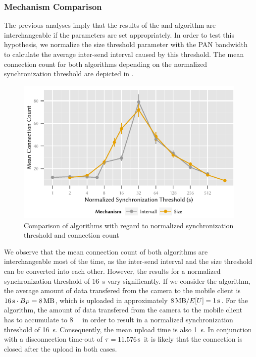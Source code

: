 \subsubsection*{Mechanism Comparison}\label{sec:application:cloud_file_synchronisation:numerical_evaluation:mechanism_comparison}
The previous analyses imply that the results of the \algointerval and \algosize algorithm are interchangeable if the parameters are set appropriately.
In order to test this hypothesis, we normalize the size threshold parameter with the \gls{PAN} bandwidth to calculate the average inter-send interval caused by this threshold.
The mean connection count for both algorithms depending on the normalized synchronization threshold are depicted in . 
\begin{figure}
  \includegraphics{application/cloud_file_synchronization/numerical_evaluation/figures/comparison}
  \caption{Comparison of algorithms with regard to normalized synchronization threshold and connection count}
  \label{fig:application:cloud_file_synchronisation:numerical_evaluation:mechanism_comparison:comparison}
\end{figure}

We observe that the mean connection count of both algorithms are interchangeable most of the time, as the inter-send interval and the size threshold can be converted into each other.
However, the results for a normalized synchronization threshold of \SI{16}{\second} vary significantly.
If we consider the \algointerval algorithm, the average amount of data transfered from the camera to the mobile client is \(\SI{16}{\second} \cdot \panTransferRate=\SI{8}{\mega\byte}\), which is uploaded in approximately \(\SI{8}{\mega\byte} / E[U] = \SI{1}{\second}\).
For the \algosize algorithm, the amount of data transfered from the camera to the mobile client has to accumulate to \SI{8}{\mega\byte} in order to result in a normalized synchronization threshold of \SI{16}{\second}.
Consequently, the mean upload time is also \SI{1}{\second}.
In conjunction with a disconnection time-out of \(\tau = \SI{11.576}{\second}\) it is likely that the connection is closed after the upload in both cases.

